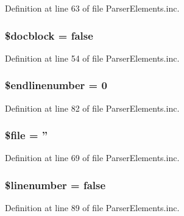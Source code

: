 \-Definition at line 63 of file \-Parser\-Elements.\-inc.

\hypertarget{classparser_element_abf700ed3060f06f15a7a01354dfd4087}{
\subsubsection[{\$docblock}]{\setlength{\rightskip}{0pt plus 5cm}\$docblock = false}}\label{classparser_element_abf700ed3060f06f15a7a01354dfd4087}


\-Definition at line 54 of file \-Parser\-Elements.\-inc.

\hypertarget{classparser_element_a4d96f7721accddf9974537185fe43f0e}{
\subsubsection[{\$endlinenumber}]{\setlength{\rightskip}{0pt plus 5cm}\$endlinenumber = 0}}\label{classparser_element_a4d96f7721accddf9974537185fe43f0e}


\-Definition at line 82 of file \-Parser\-Elements.\-inc.

\hypertarget{classparser_element_aa1bfbd27060176201b271918dff57e8f}{
\subsubsection[{\$file}]{\setlength{\rightskip}{0pt plus 5cm}\$file = ''}}\label{classparser_element_aa1bfbd27060176201b271918dff57e8f}


\-Definition at line 69 of file \-Parser\-Elements.\-inc.

\hypertarget{classparser_element_ab6068db00e5a532a6c7211da1897185b}{
\subsubsection[{\$linenumber}]{\setlength{\rightskip}{0pt plus 5cm}\$linenumber = false}}\label{classparser_element_ab6068db00e5a532a6c7211da1897185b}


\-Definition at line 89 of file \-Parser\-Elements.\-inc.

